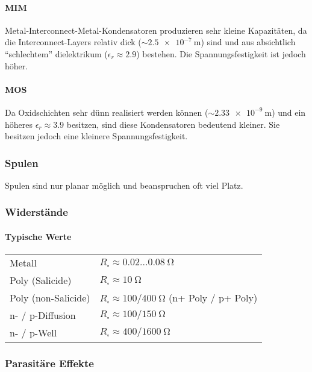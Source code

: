 \paragraph{MIM}

Metal-Interconnect-Metal-Kondensatoren produzieren sehr kleine Kapazitäten, da die Interconnect-Layers relativ dick ($\sim \qty{2.5e-7}{\meter}$) sind und aus absichtlich ``schlechtem'' dielektrikum ($\epsilon_r \approx 2.9$) bestehen.
Die Spannungsfestigkeit ist jedoch höher.

\paragraph{MOS}

Da Oxidschichten sehr dünn realisiert werden können ($\sim \qty{2.33e-9}{\meter}$) und ein höheres $\epsilon_r \approx 3.9$ besitzen, sind diese Kondensatoren bedeutend kleiner.
Sie besitzen jedoch eine kleinere Spannungsfestigkeit.

\subsubsection{Spulen}
Spulen sind nur planar möglich und beanspruchen oft viel Platz.

\subsubsection{Widerstände}
\begin{center}
\end{center}
\begin{center}
\end{center}

\paragraph{Typische Werte}

\begin{tabular}{l l}
    Metall              & $R_\square \approx 0.02 ... \qty{0.08}{\ohm}$                  \\
    Poly (Salicide)     & $R_\square \approx \qty{10}{\ohm}$                             \\
    Poly (non-Salicide) & $R_\square \approx 100/\qty{400}{\ohm}$ (n+ Poly / p+ Poly)    \\
    n- / p-Diffusion    & $R_\square \approx 100/\qty{150}{\ohm}$                        \\
    n- / p-Well         & $R_\square \approx 400/\qty{1600}{\ohm}$                       \\
\end{tabular}

\subsubsection{Parasitäre Effekte}
